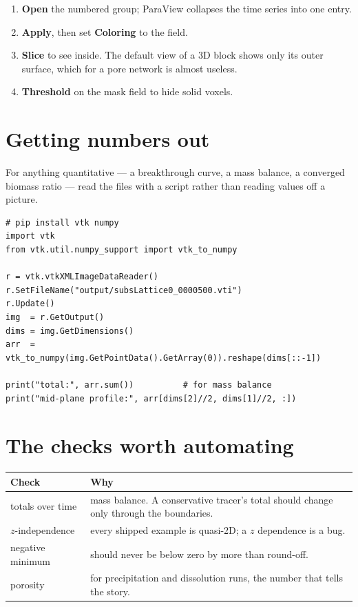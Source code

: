\begin{enumerate}[leftmargin=1.4em]
\item \textbf{Open} the numbered group; ParaView collapses the time series into
one entry.
\item \textbf{Apply}, then set \textbf{Coloring} to the field.
\item \textbf{Slice} to see inside. The default view of a 3D block shows only
its outer surface, which for a pore network is almost useless.
\item \textbf{Threshold} on the mask field to hide solid voxels.
\end{enumerate}


\section{Getting numbers out}

For anything quantitative --- a breakthrough curve, a mass balance, a converged
biomass ratio --- read the  files with a script rather than reading
values off a picture.

\begin{lstlisting}[style=py]
# pip install vtk numpy
import vtk
from vtk.util.numpy_support import vtk_to_numpy

r = vtk.vtkXMLImageDataReader()
r.SetFileName("output/subsLattice0_0000500.vti")
r.Update()
img  = r.GetOutput()
dims = img.GetDimensions()
arr  = vtk_to_numpy(img.GetPointData().GetArray(0)).reshape(dims[::-1])

print("total:", arr.sum())          # for mass balance
print("mid-plane profile:", arr[dims[2]//2, dims[1]//2, :])
\end{lstlisting}

\section{The checks worth automating}

\begin{center}
\begin{tabular}{@{}p{4.2cm}p{10.6cm}@{}}
\toprule
\textbf{Check} & \textbf{Why}\\
\midrule
totals over time & mass balance. A conservative tracer's total should change only through the boundaries.\\
$z$-independence & every shipped example is quasi-2D; a $z$ dependence is a bug.\\
negative minimum & should never be below zero by more than round-off.\\
porosity & for precipitation and dissolution runs, the number that tells the story.\\
\bottomrule
\end{tabular}
\end{center}
